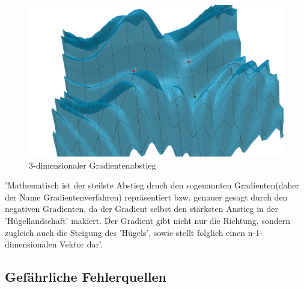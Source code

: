 \begin{figure}[ht]
    \begin{minipage}{0.45\textwidth}
        \centering
        \includegraphics[width=\textwidth]{Sources/03-3.2.3_geogebra.png}
        \caption{3-dimensionaler Gradientenabstieg}
        \label{subsec:3-dimensionaler Gradientenabstieg}
    \end{minipage}
\end{figure}
\newpage
 'Mathematisch ist der steilste Abstieg druch den sogenannten Gradienten(daher der Name Gradientenverfahren) repräsentiert bzw. genauer gesagt durch den negativen Gradienten, da der 
  Gradient selbst den stärksten Anstieg in der 'Hügellandschaft' makiert. Der Gradient gibt nicht nur die Richtung, sondern zugleich auch die Steigung des 'Hügels', sowie stellt folglich
  einen n-1-dimensionalen Vektor dar'\cite{GR10}.
\fi
\subsection{Gefährliche Fehlerquellen}\label{subsec:gradientenverfahren:fehlerquellen}
